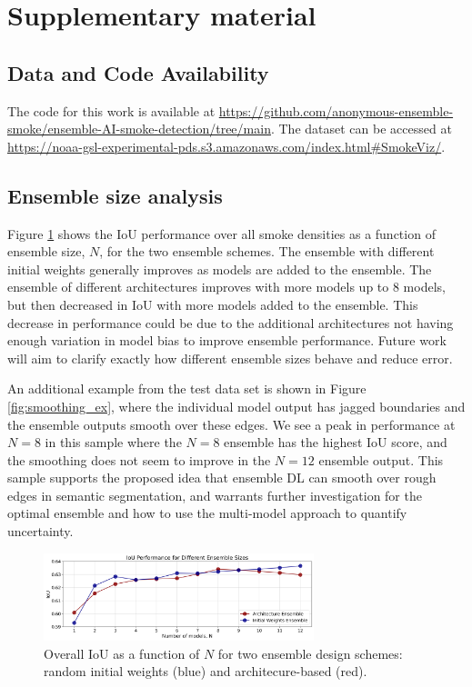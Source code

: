 \documentclass{article}
\begin{document}
\newpage

 

\section{Supplementary material}
\subsection{Data and Code Availability}\label{sec:data-code} The code for this work is available at \url{https://github.com/anonymous-ensemble-smoke/ensemble-AI-smoke-detection/tree/main}. The dataset can be accessed at \url{https://noaa-gsl-experimental-pds.s3.amazonaws.com/index.html#SmokeViz/}.

\subsection{Ensemble size analysis}\label{sec:ens-size} 
Figure \ref{fig:ensemble_size_plot} shows the IoU performance over all smoke densities as a function of ensemble size, $N$, for the two ensemble schemes. The ensemble with different initial weights generally improves as models are added to the ensemble. The ensemble of different architectures improves with more models up to 8 models, but then decreased in IoU with more models added to the ensemble. This decrease in performance could be due to the additional architectures not having enough variation in model bias to improve ensemble performance. Future work will aim to clarify exactly how different ensemble sizes behave and reduce error. 

An additional example from the test data set is shown in Figure \ref{fig:smoothing_ex}, where the individual model output has jagged boundaries and the ensemble outputs smooth over these edges. We see a peak in performance at $N=8$ in this sample where the $N=8$ ensemble has the highest IoU score, and the smoothing does not seem to improve in the $N=12$ ensemble output. This sample supports the proposed idea that ensemble DL can smooth over rough edges in semantic segmentation, and warrants further investigation for the optimal ensemble and how to use the multi-model approach to quantify uncertainty. 
\begin{figure}
    \centering
    \includegraphics[width=0.70\textwidth]{ensemble_size_plot.png}
    \caption{\RaggedRight Overall IoU as a function of $N$ for two ensemble design schemes: random initial weights (blue) and architecure-based (red).}
    \label{fig:ensemble_size_plot}
\end{figure}
\end{document}
